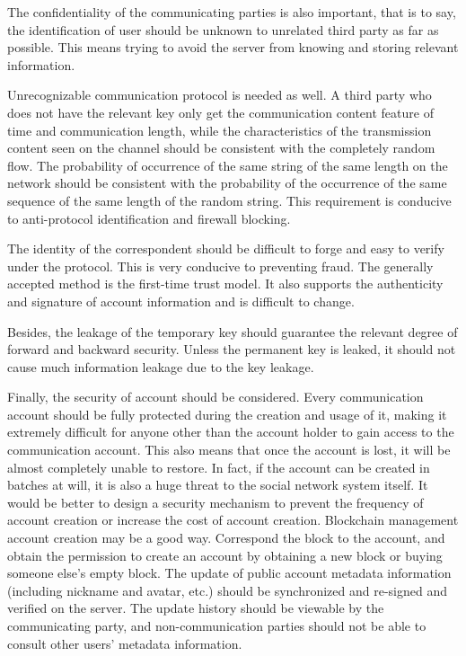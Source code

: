 \documentclass[11pt,en]{elegantpaper}
\begin{document}
The confidentiality of the communicating parties is also important, that is to say, the identification of user should be unknown to unrelated third party as far as possible. This means trying to avoid the server from knowing and storing relevant information.

Unrecognizable communication protocol is needed as well. A third party who does not have the relevant key only get the communication content feature of time and communication length, while the characteristics of the transmission content seen on the channel should be consistent with the completely random flow. The probability of occurrence of the same string of the same length on the network should be consistent with the probability of the occurrence of the same sequence of the same length of the random string. This requirement is conducive to anti-protocol identification and firewall blocking.

The identity of the correspondent should be difficult to forge and easy to verify under the protocol. This is very conducive to preventing fraud. The generally accepted method is the first-time trust model. It also supports the authenticity and signature of account information and is difficult to change.

Besides, the leakage of the temporary key should guarantee the relevant degree of forward and backward security. Unless the permanent key is leaked, it should not cause much information leakage due to the key leakage.

Finally, the security of account should be considered. Every communication account should be fully protected during the creation and usage of it, making it extremely difficult for anyone other than the account holder to gain access to the communication account. This also means that once the account is lost, it will be almost completely unable to restore. In fact, if the account can be created in batches at will, it is also a huge threat to the social network system itself. It would be better to design a security mechanism to prevent the frequency of account creation or increase the cost of account creation. Blockchain management account creation may be a good way. Correspond the block to the account, and obtain the permission to create an account by obtaining a new block or buying someone else's empty block. The update of public account metadata information (including nickname and avatar, etc.) should be synchronized and re-signed and verified on the server. The update history should be viewable by the communicating party, and non-communication parties should not be able to consult other users' metadata information.
\end{document}
